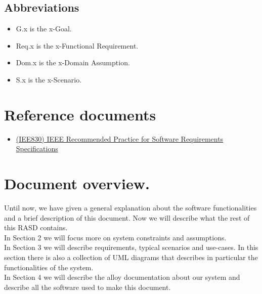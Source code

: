 		\subsection{Abbreviations}
			\begin{itemize}
				\item G.x is the x-Goal.
				\item Req.x is the x-Functional Requirement.
				\item Dom.x is the x-Domain Assumption.
				\item S.x is the x-Scenario.
			\end{itemize}
		
	\section{Reference documents}
		\begin{itemize}
			\item \href{http://www.math.uaa.alaska.edu/~afkjm/cs401/IEEE830.pdf}{(IEE830) IEEE Recommended Practice for Software Requirements Specifications}
		\end{itemize}
		
	\section{Document overview.}
	Until now, we have given a general explanation about the software functionalities and a brief description of this document. Now we will describe what the rest of this RASD contains.\\
	In Section 2 we will focus more on system constraints and assumptions.\\
	In Section 3 we will describe requirements, typical scenarios and use-cases. In this section there is also a collection of UML diagrams that describes in particular the functionalities of the system.\\
	In Section 4 we will describe the alloy documentation about our system and describe all the software used to make this document.